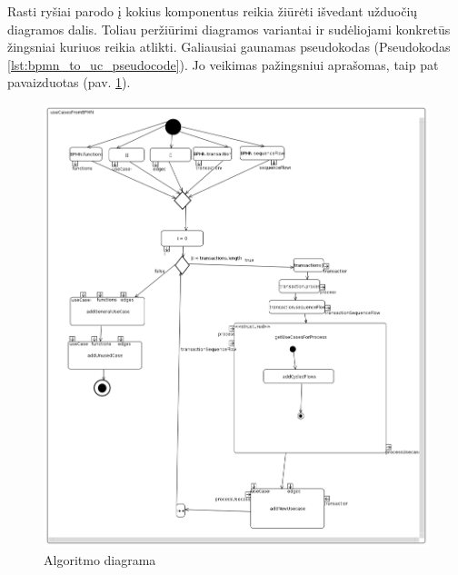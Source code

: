 Rasti ryšiai parodo į kokius \DVCM{} komponentus reikia žiūrėti išvedant užduočių diagramos dalis. Toliau peržiūrimi diagramos variantai ir sudėliojami konkretūs žingsniai kuriuos reikia atlikti. Galiausiai gaunamas pseudokodas (Pseudokodas \ref{lst:bpmn_to_uc_pseudocode}). Jo veikimas pažingsniui aprašomas, taip pat pavaizduotas (pav. \ref{img:algorythm_activity_diagram}).

\begin{figure}[H]
	\centering
	\includegraphics[scale=0.5]{img/algorythm-activity-diagram}
  \caption{Algoritmo diagrama}
	\label{img:algorythm_activity_diagram}
\end{figure}

